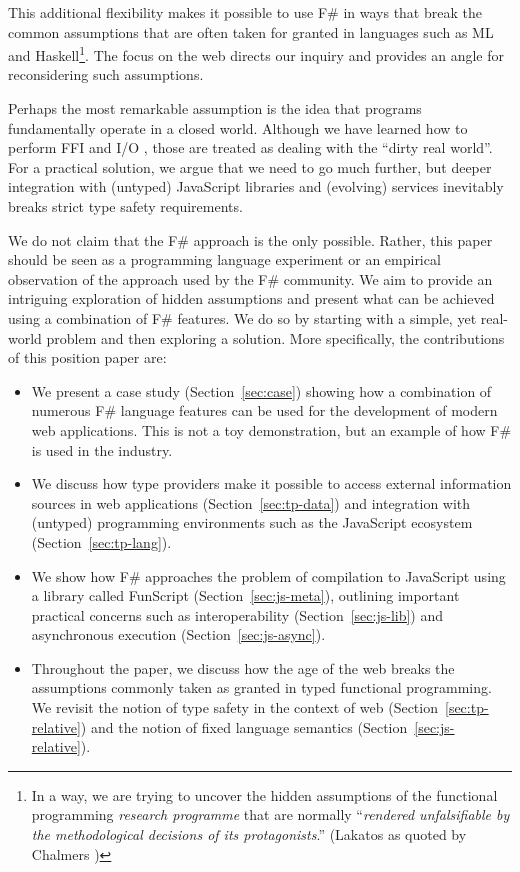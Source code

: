 \documentclass[submission,copyright,creativecommons]{eptcs}
\begin{document}
This additional flexibility makes it possible to use F\# in ways that break the common assumptions
that are often taken for granted in languages such as ML and Haskell\footnote{In a way, we are trying
to uncover the hidden assumptions of the functional programming \emph{research programme} that are
normally ``\emph{rendered unfalsifiable by the methodological decisions of its protagonists}.'' 
(Lakatos \cite{philosophy-lakatos} as quoted by Chalmers \cite{philosophy-thing})}. The focus on 
the web directs our inquiry and provides an angle for reconsidering such assumptions. 

Perhaps the most remarkable assumption is the idea that programs fundamentally operate in a closed
world. Although we have learned how to perform FFI and I/O \cite{haskell-ffi,haskell-imperative},
those are treated as dealing with the ``dirty real world''. For a practical solution, we argue that
we need to go much further, but deeper integration with (untyped) JavaScript libraries and (evolving) 
services inevitably breaks strict type safety requirements.

We do not claim that the F\# approach is the only possible. Rather, this paper should be seen
as a programming language experiment \cite{philosophy-pl} or an empirical observation of the 
approach used by the F\# community. We aim to provide an intriguing exploration of hidden assumptions 
and present what can be achieved using a combination of F\# features. We do so by starting with 
a simple, yet real-world problem and then exploring a solution. More specifically, the contributions 
of this position paper are:

\begin{itemize}
\item We present a case study (Section~\ref{sec:case}) showing how a combination of numerous
  F\# language features can be used for the development of modern web applications. This
  is not a toy demonstration, but an example of how F\# is used in the industry.

\item We discuss how type providers make it possible to access external information sources
  in web applications (Section~\ref{sec:tp-data}) and integration with (untyped) programming
  environments such as the JavaScript ecosystem (Section~\ref{sec:tp-lang}). 

\item We show how F\# approaches the problem of compilation to JavaScript using a library 
  called FunScript (Section~\ref{sec:js-meta}), outlining important practical concerns such as 
  interoperability (Section~\ref{sec:js-lib}) and asynchronous execution (Section~\ref{sec:js-async}).

\item Throughout the paper, we discuss how the age of the web breaks the assumptions commonly 
  taken as granted in typed functional programming. We revisit the notion of type safety
  in the context of web (Section~\ref{sec:tp-relative}) and the notion of fixed language 
  semantics (Section~\ref{sec:js-relative}).
\end{itemize}
\end{document}
